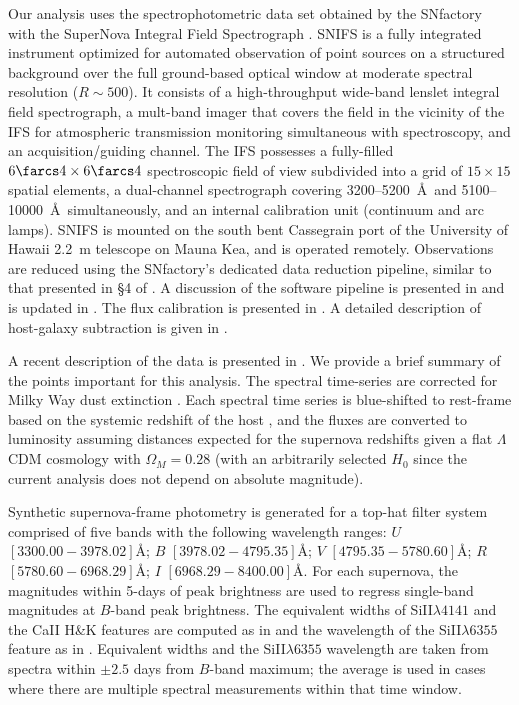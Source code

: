 \documentclass{aastex61}   	%
\begin{document}
Our analysis uses the spectrophotometric data set obtained by
the SNfactory with the SuperNova Integral Field
Spectrograph \citep[SNIFS,][]{2002SPIE.4836...61A, 2004SPIE.5249..146L}.  SNIFS is a fully integrated
instrument optimized for automated observation of point sources on a
structured background over the full ground-based optical window at
moderate spectral resolution ($R \sim 500$).  It consists of a
high-throughput wide-band lenslet integral field spectrograph, a mult-band
imager that covers the field in the vicinity of
the IFS for atmospheric transmission monitoring simultaneous with
spectroscopy, and an acquisition/guiding channel.  The IFS possesses a
fully-filled $6\farcs 4 \times 6\farcs 4$ spectroscopic field of view
subdivided into a grid of $15 \times 15$ spatial elements, a
dual-channel spectrograph covering 3200--5200~\AA\ and 5100--10000~\AA\
simultaneously, and an internal calibration unit (continuum and arc
lamps).  SNIFS is mounted on the south bent Cassegrain port of the
University of Hawaii 2.2~m telescope on Mauna Kea, and is operated
remotely.  Observations are reduced using the SNfactory's dedicated data
reduction pipeline, similar to that presented in \S4 of \citet{2001MNRAS.326...23B}.
A discussion of the software pipeline is presented in
\citet{2006ApJ...650..510A} and is updated in \citet{2010ApJ...713.1073S}. 
The flux calibration is presented in \citet{2013A&A...549A...8B}.
A detailed
description of host-galaxy subtraction is given in \citet{2011MNRAS.418..258B}.

A recent description of the data is presented in \citet{2015ApJ...815...58F}.
We provide a brief summary of the points important for this analysis.
The spectral time-series  are corrected for Milky Way dust
extinction \citep{1989ApJ...345..245C,1998ApJ...500..525S}.  
Each spectral time series is
blue-shifted to rest-frame
based on the systemic redshift of the host \citep[c.f.][]{2013ApJ...770..107C}, and the fluxes are converted to luminosity assuming
distances expected for the supernova redshifts given a flat
$\Lambda$CDM cosmology with $\Omega_M = 0.28$ (with an arbitrarily selected
$H_0$ since the current analysis does not depend on absolute magnitude).

Synthetic supernova-frame photometry is generated for a top-hat filter system
comprised of five 
bands with the following wavelength ranges: $U$ $[3300.00 - 3978.02]$\AA;
$B$ $[3978.02-4795.35]$\AA;
$V$ $[4795.35-5780.60]$\AA;
$R$ $[5780.60-6968.29]$\AA;
$I$ $[6968.29-8400.00]$\AA.
For each supernova, the magnitudes within 5-days of peak brightness are used to regress single-band magnitudes
at $B$-band peak brightness.
The equivalent widths of SiII$\lambda 4141$ and the CaII H\&K features are computed as
in \citet{2008A&A...477..717B} and the 
wavelength of the SiII$\lambda 6355$ feature
as in \citet{chotard:thesis, 2017Chotard}.
Equivalent widths and the
SiII$\lambda 6355$ wavelength are taken from spectra  within $\pm 2.5$ days from $B$-band maximum;
the average is used  in cases where there are multiple spectral measurements within that time window.
\end{document}
